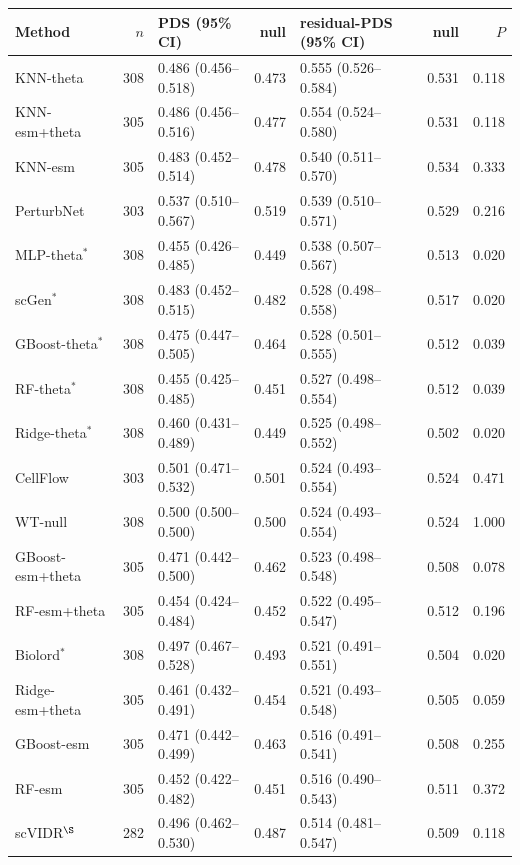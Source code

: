 \documentclass[11pt,letterpaper]{article}
\begin{document}
\begin{table}[H]
\label{tab:axes}
\footnotesize
\begin{tabular}{@{}l r l r l r r@{}}
\toprule
Method & $n$ & PDS (95\% CI) & null & residual-PDS (95\% CI) & null & $P$ \\
\midrule
KNN-theta & 308 & 0.486 (0.456--0.518) & 0.473 & 0.555 (0.526--0.584) & 0.531 & 0.118 \\
KNN-esm+theta & 305 & 0.486 (0.456--0.516) & 0.477 & 0.554 (0.524--0.580) & 0.531 & 0.118 \\
KNN-esm & 305 & 0.483 (0.452--0.514) & 0.478 & 0.540 (0.511--0.570) & 0.534 & 0.333 \\
PerturbNet & 303 & 0.537 (0.510--0.567) & 0.519 & 0.539 (0.510--0.571) & 0.529 & 0.216 \\
MLP-theta$^{*}$ & 308 & 0.455 (0.426--0.485) & 0.449 & 0.538 (0.507--0.567) & 0.513 & 0.020 \\
scGen$^{*}$ & 308 & 0.483 (0.452--0.515) & 0.482 & 0.528 (0.498--0.558) & 0.517 & 0.020 \\
GBoost-theta$^{*}$ & 308 & 0.475 (0.447--0.505) & 0.464 & 0.528 (0.501--0.555) & 0.512 & 0.039 \\
RF-theta$^{*}$ & 308 & 0.455 (0.425--0.485) & 0.451 & 0.527 (0.498--0.554) & 0.512 & 0.039 \\
Ridge-theta$^{*}$ & 308 & 0.460 (0.431--0.489) & 0.449 & 0.525 (0.498--0.552) & 0.502 & 0.020 \\
CellFlow & 303 & 0.501 (0.471--0.532) & 0.501 & 0.524 (0.493--0.554) & 0.524 & 0.471 \\
WT-null & 308 & 0.500 (0.500--0.500) & 0.500 & 0.524 (0.493--0.554) & 0.524 & 1.000 \\
GBoost-esm+theta & 305 & 0.471 (0.442--0.500) & 0.462 & 0.523 (0.498--0.548) & 0.508 & 0.078 \\
RF-esm+theta & 305 & 0.454 (0.424--0.484) & 0.452 & 0.522 (0.495--0.547) & 0.512 & 0.196 \\
Biolord$^{*}$ & 308 & 0.497 (0.467--0.528) & 0.493 & 0.521 (0.491--0.551) & 0.504 & 0.020 \\
Ridge-esm+theta & 305 & 0.461 (0.432--0.491) & 0.454 & 0.521 (0.493--0.548) & 0.505 & 0.059 \\
GBoost-esm & 305 & 0.471 (0.442--0.499) & 0.463 & 0.516 (0.491--0.541) & 0.508 & 0.255 \\
RF-esm & 305 & 0.452 (0.422--0.482) & 0.451 & 0.516 (0.490--0.543) & 0.511 & 0.372 \\
scVIDR$^{\S}$ & 282 & 0.496 (0.462--0.530) & 0.487 & 0.514 (0.481--0.547) & 0.509 & 0.118 \\

\end{tabular}
\end{table}
\end{document}

